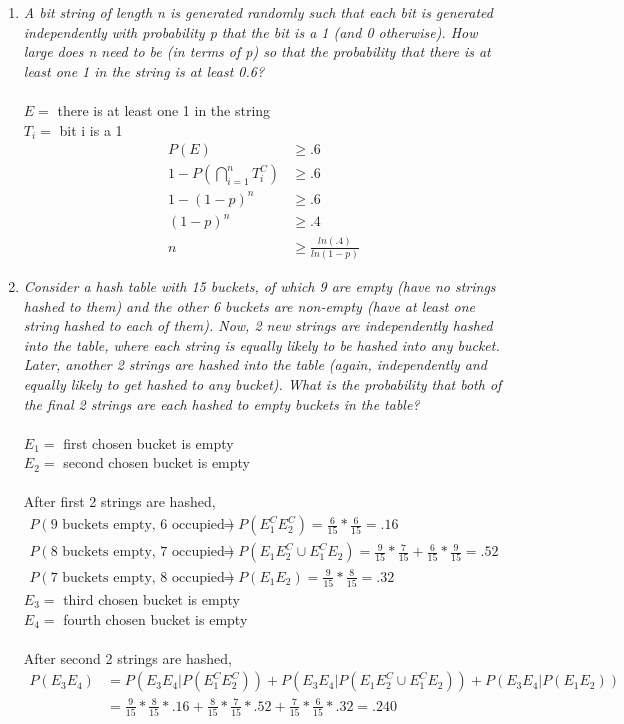 \documentclass{article} %
\begin{document}
\begin{enumerate}
	\item \textit{A bit string of length n is generated randomly such that each bit is generated independently with probability p that the bit is a 1 (and 0 otherwise). How large does n need to be (in terms of p) so that the probability that there is at least one 1 in the string is at least 0.6?}\\
	\\
	$E =$ there is at least one 1 in the string\\
	$T_i =$ bit i is a 1
	\begin{align*}
	P(E) &\geq .6\\
	1 - P(\bigcap_{i = 1}^{n} T_i^C) &\geq .6\\
	1 - (1 - p)^n &\geq .6\\
	(1 - p)^n &\geq .4\\
	n &\geq \frac{ln(.4)}{ln(1 - p)}
	\end{align*}
	
	\item \textit{Consider a hash table with 15 buckets, of which 9 are empty (have no strings hashed to them) and the other 6 buckets are non-empty (have at least one string hashed to each of them). Now, 2 new strings are independently hashed into the table, where each string is equally likely to be hashed into any bucket. Later, another 2 strings are hashed into the table (again, independently and equally likely to get hashed to any bucket). What is the probability that both of the final 2 strings are each hashed to empty buckets in the table?}\\
	\\
	$E_1 =$ first chosen bucket is empty\\
	$E_2 =$ second chosen bucket is empty\\
	\\
	After first 2 strings are hashed,
	\begin{align*}
	P(\text{9 buckets empty, 6 occupied}) &= P(E_1^CE_2^C) = \frac{6}{15} * \frac{6}{15} = .16\\
	P(\text{8 buckets empty, 7 occupied}) &= P(E_1E_2^C \cup E_1^CE_2) = \frac{9}{15} * \frac{7}{15} + \frac{6}{15} * \frac{9}{15} = .52\\
	P(\text{7 buckets empty, 8 occupied}) &= P(E_1E_2) = \frac{9}{15} * \frac{8}{15} = .32
	\end{align*}
	$E_3 =$ third chosen bucket is empty\\
	$E_4 =$ fourth chosen bucket is empty\\
	\\
	After second 2 strings are hashed,
	\begin{align*}
	P(E_3E_4) &= P(E_3E_4 | P(E_1^CE_2^C)) + P(E_3E_4 | P(E_1E_2^C \cup E_1^CE_2)) + P(E_3E_4 | P(E_1E_2))\\
	&= \frac{9}{15} * \frac{8}{15} * .16 + \frac{8}{15} * \frac{7}{15} * .52 + \frac{7}{15} * \frac{6}{15} * .32 = .240
	\end{align*}
	

\end{enumerate}
\end{document}
